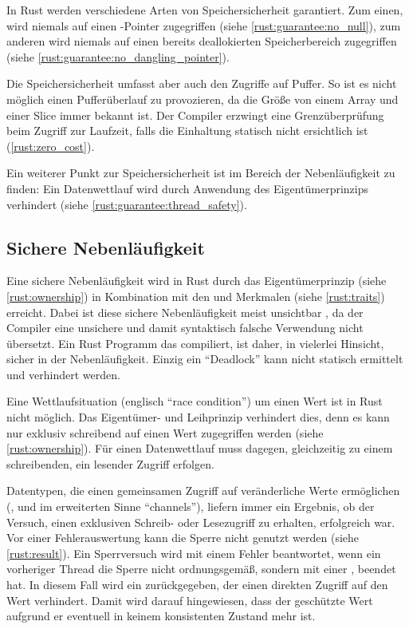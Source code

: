 In Rust werden verschiedene Arten von Speichersicherheit garantiert. Zum einen, wird niemals auf einen -Pointer zugegriffen (siehe \autoref{rust:guarantee:no_null}), zum anderen wird niemals auf einen bereits deallokierten Speicherbereich zugegriffen (siehe \autoref{rust:guarantee:no_dangling_pointer}).

Die Speichersicherheit umfasst aber auch den Zugriffe auf Puffer. So ist es nicht möglich einen Pufferüberlauf zu provozieren, da die Größe von einem Array und einer Slice immer bekannt ist.
Der Compiler erzwingt eine Grenzüberprüfung beim Zugriff zur Laufzeit, falls die Einhaltung statisch nicht ersichtlich ist (\autoref{rust:zero_cost}).

Ein weiterer Punkt zur Speichersicherheit ist im Bereich der Nebenläufigkeit zu finden: Ein Datenwettlauf wird durch Anwendung des Eigentümerprinzips verhindert (siehe \autoref{rust:guarantee:thread_safety}).

\subsection{Sichere Nebenläufigkeit}
\label{rust:guarantee:thread_safety}

Eine sichere Nebenläufigkeit wird in Rust durch das Eigentümerprinzip (siehe \autoref{rust:ownership}) in Kombination mit den  und  Merkmalen (siehe \autoref{rust:traits}) erreicht.
Dabei ist diese sichere Nebenläufigkeit meist unsichtbar \cite[41]{rust:orly_programming}, da der Compiler eine unsichere und damit syntaktisch falsche Verwendung nicht übersetzt.
Ein Rust Programm das compiliert, ist daher, in vielerlei Hinsicht, sicher in der Nebenläufigkeit.
Einzig ein \enquote{Deadlock} kann nicht statisch ermittelt und verhindert werden.

Eine Wettlaufsituation (englisch \enquote{race condition}) um einen Wert ist in Rust nicht möglich.
Das Eigentümer- und Leihprinzip verhindert dies, denn es kann nur exklusiv schreibend auf einen Wert zugegriffen werden (siehe \autoref{rust:ownership}).
Für einen Datenwettlauf muss dagegen, gleichzeitig zu einem schreibenden, ein lesender Zugriff erfolgen.

Datentypen, die einen gemeinsamen Zugriff auf veränderliche Werte ermöglichen (,  und im erweiterten Sinne \enquote{channels}), liefern immer ein Ergebnis, ob der  Versuch, einen exklusiven Schreib- oder Lesezugriff zu erhalten, erfolgreich war.
Vor einer Fehlerauswertung kann die Sperre nicht genutzt werden (siehe \autoref{rust:result}).
Ein Sperrversuch wird mit einem Fehler beantwortet, wenn ein vorheriger Thread die Sperre nicht ordnungsgemäß, sondern mit einer , beendet hat.
In diesem Fall wird ein  zurückgegeben, der einen direkten Zugriff auf den Wert verhindert.
Damit wird darauf hingewiesen, dass der geschützte Wert aufgrund er  eventuell in keinem konsistenten Zustand mehr ist.

